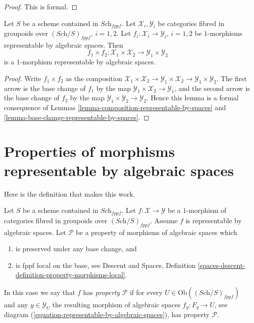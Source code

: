 \begin{proof}
This is formal.
\end{proof}

\begin{lemma}
\label{lemma-product-representable-by-spaces}
Let $S$ be a scheme contained in $\textit{Sch}_{fppf}$.
Let $\mathcal{X}_i, \mathcal{Y}_i$ be categories fibred in groupoids over
$(\textit{Sch}/S)_{fppf}$, $i = 1, 2$.
Let $f_i : \mathcal{X}_i \to \mathcal{Y}_i$, $i = 1, 2$
be $1$-morphisms representable by algebraic spaces.
Then
$$
f_1 \times f_2 :
\mathcal{X}_1 \times \mathcal{X}_2
\longrightarrow
\mathcal{Y}_1 \times \mathcal{Y}_2
$$
is a $1$-morphism representable by algebraic spaces.
\end{lemma}

\begin{proof}
Write $f_1 \times f_2$ as the composition
$\mathcal{X}_1 \times \mathcal{X}_2 \to
\mathcal{Y}_1 \times \mathcal{X}_2 \to
\mathcal{Y}_1 \times \mathcal{Y}_2$.
The first arrow is the base change of $f_1$ by the map
$\mathcal{Y}_1 \times \mathcal{X}_2 \to \mathcal{Y}_1$, and the second arrow
is the base change of $f_2$ by the map
$\mathcal{Y}_1 \times \mathcal{Y}_2 \to \mathcal{Y}_2$.
Hence this lemma is a formal
consequence of Lemmas \ref{lemma-composition-representable-by-spaces}
and \ref{lemma-base-change-representable-by-spaces}.
\end{proof}












\section{Properties of morphisms representable by algebraic spaces}
\label{section-representable-properties}

\noindent
Here is the definition that makes this work.

\begin{definition}
\label{definition-relative-representable-property}
Let $S$ be a scheme contained in $\textit{Sch}_{fppf}$.
Let $f : \mathcal{X} \to \mathcal{Y}$ be a $1$-morphism
of categories fibred in groupoids over $(\textit{Sch}/S)_{fppf}$.
Assume $f$ is representable by algebraic spaces.
Let $\mathcal{P}$ be a property of morphisms of algebraic spaces which
\begin{enumerate}
\item is preserved under any base change, and
\item is fppf local on the base, see
Descent and Spaces,
Definition \ref{spaces-descent-definition-property-morphisms-local}.
\end{enumerate}
In this case we say that $f$ has {\it property $\mathcal{P}$} if for every
$U \in \text{Ob}((\textit{Sch}/S)_{fppf})$ and
any $y \in \mathcal{Y}_U$ the resulting morphism of algebraic spaces
$f_y : F_y \to U$, see
diagram (\ref{equation-representable-by-algebraic-spaces}),
has property $\mathcal{P}$.
\end{definition}


